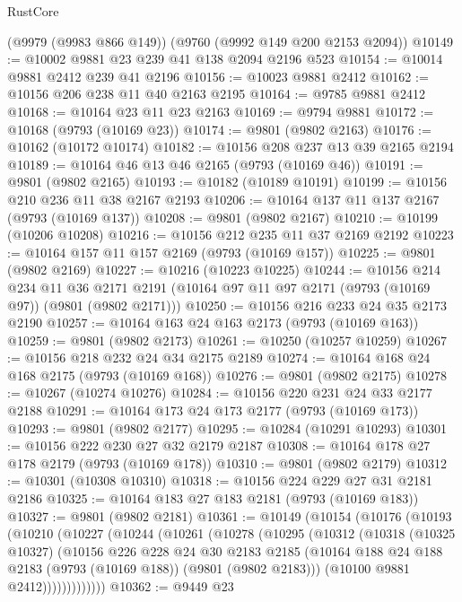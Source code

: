 \begin{lexlean}{RustCore}
\begin{coremodule}
    (@9979 (@9983 @866 @149))
    (@9760 (@9992 @149 @200 @2153 @2094))
@10149 := @10002 @9881 @23 @239 @41 @138 @2094 @2196 @523
@10154 := @10014 @9881 @2412 @239 @41 @2196
@10156 := @10023 @9881 @2412
@10162 := @10156 @206 @238 @11 @40 @2163 @2195
@10164 := @9785 @9881 @2412
@10168 := @10164 @23 @11 @23 @2163
@10169 := @9794 @9881
@10172 := @10168 (@9793 (@10169 @23))
@10174 := @9801 (@9802 @2163)
@10176 := @10162 (@10172 @10174)
@10182 := @10156 @208 @237 @13 @39 @2165 @2194
@10189 := @10164 @46 @13 @46 @2165 (@9793 (@10169 @46))
@10191 := @9801 (@9802 @2165)
@10193 := @10182 (@10189 @10191)
@10199 := @10156 @210 @236 @11 @38 @2167 @2193
@10206 := @10164 @137 @11 @137 @2167 (@9793 (@10169 @137))
@10208 := @9801 (@9802 @2167)
@10210 := @10199 (@10206 @10208)
@10216 := @10156 @212 @235 @11 @37 @2169 @2192
@10223 := @10164 @157 @11 @157 @2169 (@9793 (@10169 @157))
@10225 := @9801 (@9802 @2169)
@10227 := @10216 (@10223 @10225)
@10244 := @10156
    @214
    @234
    @11
    @36
    @2171
    @2191
    (@10164 @97 @11 @97 @2171 (@9793 (@10169 @97)) (@9801 (@9802 @2171)))
@10250 := @10156 @216 @233 @24 @35 @2173 @2190
@10257 := @10164 @163 @24 @163 @2173 (@9793 (@10169 @163))
@10259 := @9801 (@9802 @2173)
@10261 := @10250 (@10257 @10259)
@10267 := @10156 @218 @232 @24 @34 @2175 @2189
@10274 := @10164 @168 @24 @168 @2175 (@9793 (@10169 @168))
@10276 := @9801 (@9802 @2175)
@10278 := @10267 (@10274 @10276)
@10284 := @10156 @220 @231 @24 @33 @2177 @2188
@10291 := @10164 @173 @24 @173 @2177 (@9793 (@10169 @173))
@10293 := @9801 (@9802 @2177)
@10295 := @10284 (@10291 @10293)
@10301 := @10156 @222 @230 @27 @32 @2179 @2187
@10308 := @10164 @178 @27 @178 @2179 (@9793 (@10169 @178))
@10310 := @9801 (@9802 @2179)
@10312 := @10301 (@10308 @10310)
@10318 := @10156 @224 @229 @27 @31 @2181 @2186
@10325 := @10164 @183 @27 @183 @2181 (@9793 (@10169 @183))
@10327 := @9801 (@9802 @2181)
@10361 := @10149
    (@10154
      (@10176
        (@10193
          (@10210
            (@10227
              (@10244
                (@10261
                  (@10278
                    (@10295
                      (@10312
                        (@10318
                          (@10325 @10327)
                          (@10156
                            @226
                            @228
                            @24
                            @30
                            @2183
                            @2185
                            (@10164 @188 @24 @188 @2183 (@9793 (@10169 @188)) (@9801 (@9802 @2183)))
                            (@10100 @9881 @2412)))))))))))))
@10362 := @9449 @23

\end{coremodule}
\end{lexlean}
